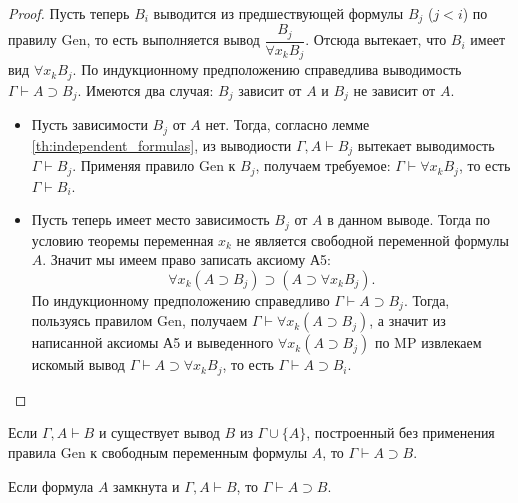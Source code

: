 \begin{proof}
    Пусть теперь $B_i$ выводится из предшествующей формулы $B_j$ ($j < i$) по правилу Gen, то есть выполняется вывод $\dfrac{B_j}{\forall x_kB_j}$. Отсюда вытекает, что $B_i$ имеет вид $\forall x_kB_j$. По индукционному предположению справедлива выводимость $\Gamma \vdash A \supset B_j$. Имеются два случая: $B_j$ зависит от $A$ и $B_j$ не зависит от $A$. 
    \begin{itemize}
        \item Пусть зависимости $B_j$ от $A$ нет. Тогда, согласно лемме \ref{th:independent_formulas}, из выводиости $\Gamma, A \vdash B_j$ вытекает выводимость $\Gamma \vdash B_j$. Применяя правило Gen к $B_j$, получаем требуемое: $\Gamma \vdash \forall x_kB_j$, то есть $\Gamma \vdash B_i$.
        \item Пусть теперь имеет место зависимость $B_j$ от $A$ в данном выводе. Тогда по условию теоремы переменная $x_k$ не является свободной переменной формулы $A$. Значит мы имеем право записать аксиому А5: 
        \[
            \forall x_k(A \supset B_j) \supset (A \supset \forall x_kB_j).
        \]
        По индукционному предположению справедливо $\Gamma \vdash A \supset B_j$. Тогда, пользуясь правилом Gen, получаем $\Gamma \vdash \forall x_k(A \supset B_j)$, а значит из написанной аксиомы А5 и выведенного $\forall x_k(A \supset B_j)$ по MP извлекаем искомый вывод $\Gamma \vdash A \supset \forall x_kB_j$, то есть $\Gamma \vdash A \supset B_i$.
    \end{itemize}
     
\end{proof}

\begin{corollary}
    Если $\Gamma, A \vdash B$ и существует вывод $B$ из $\Gamma \cup \{A\}$, построенный без применения правила Gen к свободным переменным формулы $A$, то $\Gamma \vdash A \supset B$.
\end{corollary}

\begin{corollary}
    Если формула $A$ замкнута и $\Gamma, A \vdash B$, то $\Gamma \vdash A \supset B$.
\end{corollary}


